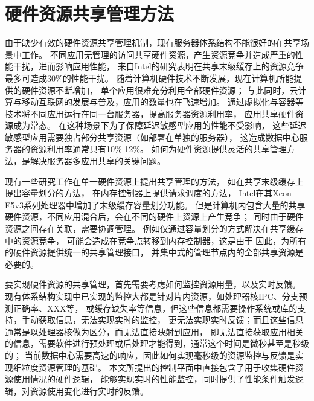 

\chapter{硬件资源共享管理方法}
\label{chap:hwresman}

由于缺少有效的硬件资源共享管理机制，现有服务器体系结构不能很好的在共享场景中工作。
不同应用无管理的访问共享硬件资源，产生资源竞争并造成严重的性能干扰，进而影响应用性能，
来自Intel的研究\cite{intel}表明在共享末级缓存上的资源竞争最多可造成30\%的性能干扰。
随着计算机硬件技术不断发展，现在计算机所能提供的硬件资源不断增加，
单个应用很难充分利用全部硬件资源；
与此同时，云计算与移动互联网的发展与普及，应用的数量也在飞速增加。
通过虚拟化与容器等技术将不同应用运行在同一台服务器，提高服务器资源利用率，
应用共享硬件资源成为常态。
在这种场景下为了保障延迟敏感型应用的性能不受影响，
这些延迟敏感型应用需要独占部分共享资源（如部署在单独的服务器\cite{}），
这造成数据中心服务器的资源利用率通常只有10\%-12\%。
如何为硬件资源提供灵活的共享管理方法，是解决服务器多应用共享的关键问题。


现有一些研究工作在单一硬件资源上提出共享管理的方法，
如在共享末级缓存上提出容量划分的方法\cite{}，
在内存控制器上提供请求调度的方法\cite{}，
Intel在其Xeon E5v3系列处理器中增加了末级缓存容量划分功能。
但是计算机内包含大量的共享硬件资源，不同应用混合后，会在不同的硬件上资源上产生竞争；
同时由于硬件资源之间存在关联，需要协调管理。
例如仅通过容量划分的方式解决在共享缓存中的资源竞争，
可能会造成在竞争点转移到内存控制器，这是由于
因此，为所有的硬件资源提供统一的共享管理接口，
并集中式的管理节点内的全部共享资源是必要的。

%
要实现硬件资源的共享管理，首先需要考虑如何监控资源用量，以及实时反馈。 %
现有体系结构实现中已实现的监控大都是针对片内资源，如处理器核IPC、分支预测正确率、XXX等，
或缓存缺失率等信息，但这些信息都需要操作系统或库的支持，手动获取信息，无法实现实时的监控，
更无法实现实时反馈；而且这些信息通常是以处理器核做为区分，而无法直接映射到应用，
即无法直接获取应用相关的信息，需要软件进行预处理或后处理才能得到，通常这个时间是微秒甚至是秒级的；
当前数据中心需要高速的响应，因此如何实现毫秒级的资源监控与反馈是实现细粒度资源管理的基础。
本文所提出的控制平面中直接包含了用于收集硬件资源使用情况的硬件逻辑，
能够实现实时的性能监控，同时提供了性能条件触发逻辑，对资源使用变化进行实时的反馈。

